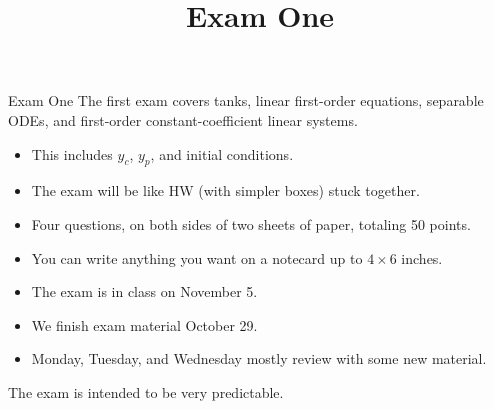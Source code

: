 \documentclass[11pt,aspectratio=169]{beamer}
\title{Exam One}
\date{}
\begin{document}
\begin{frame}{Exam One}
The first exam covers tanks, linear first-order equations, separable ODEs, and first-order constant-coefficient linear systems.
  \begin{itemize}
  	\item This includes $y_c$, $y_p$, and initial conditions.
  	\item The exam will be like HW (with simpler boxes) stuck together.
  	\item Four questions, on both sides of two sheets of paper, totaling 50 points.
  	\item You can write anything you want on a notecard up to $4\times6$ inches. 
  	\item The exam is in class on November 5.
  	\item We finish exam material October 29.
  	\item Monday, Tuesday, and Wednesday mostly review with some new material.

  \end{itemize}

The exam is intended to be very predictable.
\end{frame}
\end{document}
